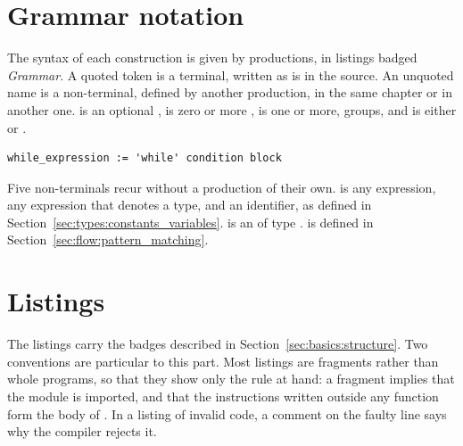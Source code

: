 \section{Grammar notation}
\label{sec:notation:grammar}

The syntax of each construction is given by productions, in listings badged
\textit{Grammar}. A quoted token is a terminal, written as is in the source. An
unquoted name is a non-terminal, defined by another production, in the same
chapter or in another one.  is an optional ,  is
zero or more ,  is one or more,  groups, and
 is either  or .

\begin{lstlisting}[style=grammarVerb]
while_expression := 'while' condition block
\end{lstlisting}

Five non-terminals recur without a production of their own.
 is any expression,  any expression that denotes
a type, and  an identifier, as defined in
Section~\ref{sec:types:constants_variables}.  is an
 of type .  is defined in
Section~\ref{sec:flow:pattern_matching}.

\section{Listings}
\label{sec:notation:listings}

The listings carry the badges described in Section~\ref{sec:basics:structure}.
Two conventions are particular to this part. Most listings are fragments rather
than whole programs, so that they show only the rule at hand: a fragment implies
that the module  is imported, and that the instructions written
outside any function form the body of . In a listing of invalid
code, a  comment on the faulty line says why the compiler
rejects it.
